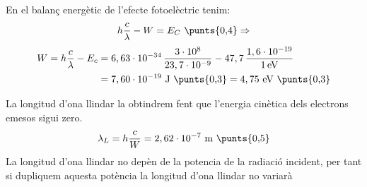 \begin{solapartat}
En el balanç energètic de l'efecte fotoelèctric tenim:
\[ h\frac{c}{\lambda} - W = E_C \ \text{\punts{0,4}} \Rightarrow \]
\begin{align*}
W = h\frac{c}{\lambda} - E_c &= 6,63\cdot 10^{-34}\,\frac{3\cdot 10^{8}}{23,7\cdot 10^{-9}} - 47,7\,\frac{1,6\cdot 10^{-19}}{1\,\mathrm{eV}}\\
&= 7,60\cdot 10^{-19}\ \mathrm{J} \ \text{\punts{0,3}} = 4,75\ \mathrm{eV} \ \text{\punts{0,3}}
\end{align*}
\end{solapartat}

\begin{solapartat}
La longitud d'ona llindar la obtindrem fent que l'energia cinètica dels electrons emesos sigui zero. 
\[ \lambda_L = h\frac{c}{W} = 2,62\cdot 10^{-7}\ \mathrm{m} \ \text{\punts{0,5}} \]
La longitud d'ona llindar no depèn de la potencia de la radiació incident, per tant si dupliquem aquesta potència la longitud d'ona llindar no variarà 
\end{solapartat}
